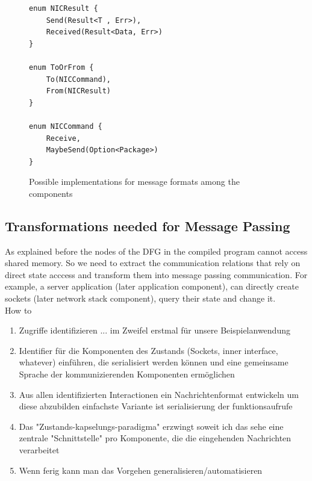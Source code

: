 \begin{figure}[H]
    \centering
\begin{verbatim}
enum NICResult {
	Send(Result<T , Err>),
	Received(Result<Data, Err>)
} 

enum ToOrFrom {
	To(NICCommand),
	From(NICResult)
} 

enum NICCommand {
	Receive,
	MaybeSend(Option<Package>)
} 
\end{verbatim}
    \caption{Possible implementations for message formats among the components}
    \label{fig:messageEnums}
\end{figure}


\subsection{Transformations needed for Message Passing}
\label{subsec:MessagePassing}
As explained before the nodes of the DFG in the compiled program cannot access shared memory. So we need to extract the communication relations that rely on direct state acccess and transform them into message passing communication. For example, a server application (later application component), can directly create sockets (later network stack component), query their state and change it. \\


How to
\begin{enumerate}
    \item Zugriffe identifizieren ... im Zweifel erstmal für unsere Beispielanwendung
    \item Identifier für die Komponenten des Zustands (Sockets, inner interface, whatever) einführen, die serialisiert werden k\"onnen und eine gemeinsame Sprache der kommunizierenden Komponenten erm\"oglichen 
    \item Aus allen identifizierten Interactionen ein Nachrichtenformat entwickeln um diese abzubilden \means einfachste Variante ist serialisierung der funktionsaufrufe
    \item Das "Zustands-kapselungs-paradigma" erzwingt soweit ich das sehe eine zentrale "Schnittstelle" pro Komponente, die die eingehenden Nachrichten verarbeitet
    \item Wenn ferig \means kann man das Vorgehen generalisieren/automatisieren
\end{enumerate}


